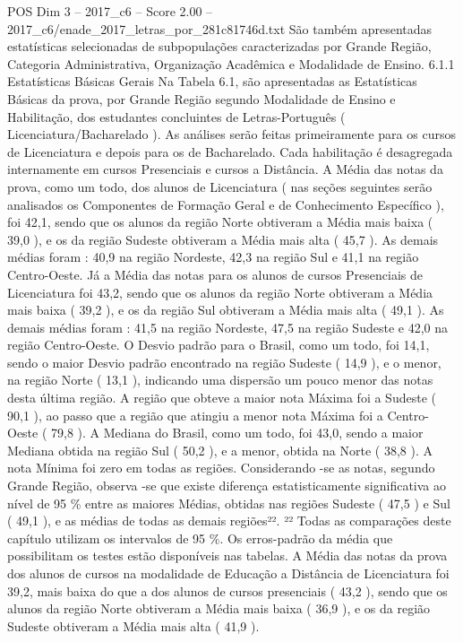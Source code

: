 \begin{textsample}{POS Dim 3 – 2017\_c6 – Score 2.00 – 2017\_c6/enade\_2017\_letras\_por\_281c81746d.txt}
São também apresentadas estatísticas selecionadas de subpopulações caracterizadas por Grande Região, Categoria Administrativa, Organização Acadêmica e Modalidade de Ensino. 6.1.1 Estatísticas Básicas Gerais Na Tabela 6.1, são apresentadas as Estatísticas Básicas da prova, por Grande Região segundo Modalidade de Ensino e Habilitação, dos estudantes concluintes de Letras-Português ( Licenciatura/Bacharelado ).
As análises serão feitas primeiramente para os cursos de Licenciatura e depois para os de Bacharelado.
Cada habilitação é desagregada internamente em cursos Presenciais e cursos a Distância.
A Média das notas da prova, como um todo, dos alunos de Licenciatura ( nas seções seguintes serão analisados os Componentes de Formação Geral e de Conhecimento Específico ), foi 42,1, sendo que os alunos da região Norte obtiveram a Média mais baixa ( 39,0 ), e os da região Sudeste obtiveram a Média mais alta ( 45,7 ).
As demais médias foram : 40,9 na região Nordeste, 42,3 na região Sul e 41,1 na região Centro-Oeste.
Já a Média das notas para os alunos de cursos Presenciais de Licenciatura foi 43,2, sendo que os alunos da região Norte obtiveram a Média mais baixa ( 39,2 ), e os da região Sul obtiveram a Média mais alta ( 49,1 ).
As demais médias foram : 41,5 na região Nordeste, 47,5 na região Sudeste e 42,0 na região Centro-Oeste.
O Desvio padrão para o Brasil, como um todo, foi 14,1, sendo o maior Desvio padrão encontrado na região Sudeste ( 14,9 ), e o menor, na região Norte ( 13,1 ), indicando uma dispersão um pouco menor das notas desta última região.
A região que obteve a maior nota Máxima foi a Sudeste ( 90,1 ), ao passo que a região que atingiu a menor nota Máxima foi a Centro-Oeste ( 79,8 ).
A Mediana do Brasil, como um todo, foi 43,0, sendo a maior Mediana obtida na região Sul ( 50,2 ), e a menor, obtida na Norte ( 38,8 ).
A nota Mínima foi zero em todas as regiões.
Considerando -se as notas, segundo Grande Região, observa -se que existe diferença estatisticamente significativa ao nível de 95 \% entre as maiores Médias, obtidas nas regiões Sudeste ( 47,5 ) e Sul ( 49,1 ), e as médias de todas as demais regiões²². ²² Todas as comparações deste capítulo utilizam os intervalos de 95 \%.
Os erros-padrão da média que possibilitam os testes estão disponíveis nas tabelas.
A Média das notas da prova dos alunos de cursos na modalidade de Educação a Distância de Licenciatura foi 39,2, mais baixa do que a dos alunos de cursos presenciais ( 43,2 ), sendo que os alunos da região Norte obtiveram a Média mais baixa ( 36,9 ), e os da região Sudeste obtiveram a Média mais alta ( 41,9 ).

\end{textsample}
